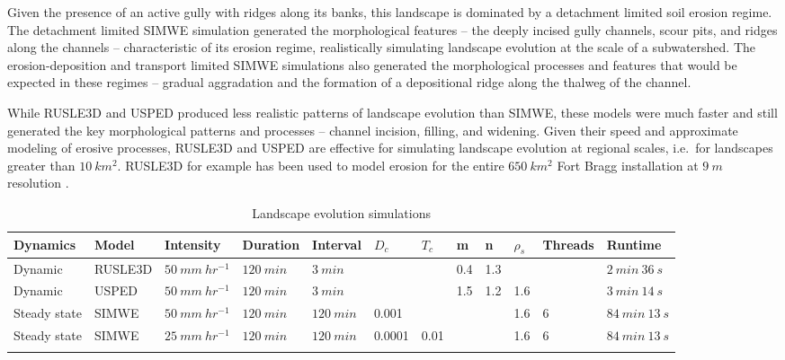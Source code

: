 \documentclass[esurf, manuscript]{copernicus}
\begin{document}
Given the presence of an active gully 
with ridges along its banks,
this landscape is dominated by 
a detachment limited soil erosion regime.
%
The detachment limited SIMWE simulation 
generated the morphological features
-- the deeply incised gully channels, 
scour pits,
and ridges along the channels 
--
characteristic of its erosion regime,
realistically simulating landscape evolution 
at the scale of a subwatershed. 
%
The erosion-deposition and transport limited 
SIMWE simulations also generated 
the morphological processes and features
that would be expected in these regimes
-- gradual aggradation
and the formation of a depositional ridge 
along the thalweg of the channel.

While RUSLE3D and USPED
produced less realistic patterns of landscape evolution
than SIMWE,
these models were much faster and still generated
the key morphological patterns and processes -- 
channel incision, filling, and widening. 
%
Given their speed
and approximate modeling of erosive processes, 
RUSLE3D and USPED 
are effective for simulating landscape evolution
at regional scales, 
i.e.~for landscapes greater than $10~km^{2}$. 
%
RUSLE3D for example has been used to
model erosion for the entire $650~km^{2}$ 
Fort Bragg installation at $9~m$ resolution
\citep{Levine2018}. 


\begin{table}
\small
\caption{Landscape evolution simulations}
\begin{tabu} to \textwidth {XXXXXllllllX}
\toprule
Dynamics & Model & Intensity & Duration & Interval & $D_c$ & $T_c$ & m & n & $\rho_s$ & Threads & Runtime\\
\midrule
Dynamic & RUSLE3D & $50~mm~hr^{-1}$ & $120~min$ & $3~min$ &  &  & 0.4 & 1.3 & & & $2~min~36~s$\\
Dynamic & USPED & $50~mm~hr^{-1}$ & $120~min$ & $3~min$ &  &  & 1.5 & 1.2 & 1.6 & & $3~min~14~s$\\
Steady state & SIMWE & $50~mm~hr^{-1}$ & $120~min$ & $120~min$ & 0.001 & & & & 1.6 & 6 & $84~min~13~s$\\
Steady state & SIMWE & $25~mm~hr^{-1}$ & $120~min$ & $120~min$ & 0.0001 & 0.01 & & & 1.6 & 6 & $84~min~13~s$\\
\bottomrule
\\
\end{tabu}
\label{table:simulations} 
\end{table}
\end{document}
